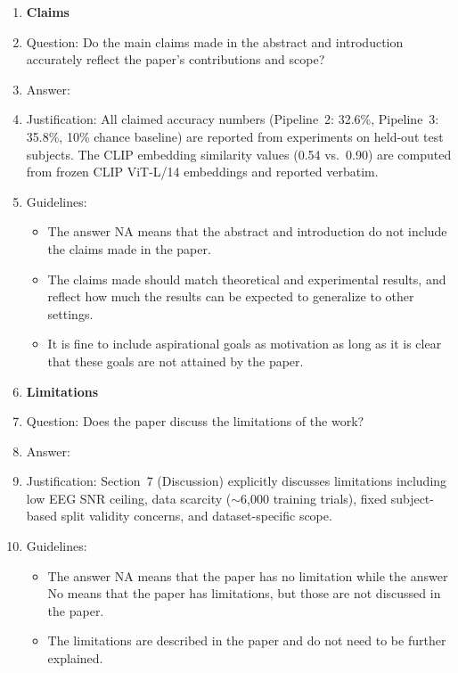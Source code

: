 \documentclass{article}
\begin{document}
\begin{enumerate}

\item {\bf Claims}
    \item[] Question: Do the main claims made in the abstract and introduction accurately reflect the paper's contributions and scope?
    \item[] Answer: \answerYes{}
    \item[] Justification: All claimed accuracy numbers (Pipeline~2: 32.6\%, Pipeline~3: 35.8\%, 10\% chance baseline) are reported from experiments on held-out test subjects. The CLIP embedding similarity values (0.54 vs.\ 0.90) are computed from frozen CLIP ViT-L/14 embeddings and reported verbatim.
    \item[] Guidelines:
    \begin{itemize}
        \item The answer NA means that the abstract and introduction do not include the claims made in the paper.
        \item The claims made should match theoretical and experimental results, and reflect how much the results can be expected to generalize to other settings.
        \item It is fine to include aspirational goals as motivation as long as it is clear that these goals are not attained by the paper.
    \end{itemize}

\item {\bf Limitations}
    \item[] Question: Does the paper discuss the limitations of the work?
    \item[] Answer: \answerYes{}
    \item[] Justification: Section~7 (Discussion) explicitly discusses limitations including low EEG SNR ceiling, data scarcity ($\sim$6,000 training trials), fixed subject-based split validity concerns, and dataset-specific scope.
    \item[] Guidelines:
    \begin{itemize}
        \item The answer NA means that the paper has no limitation while the answer No means that the paper has limitations, but those are not discussed in the paper.
        \item The limitations are described in the paper and do not need to be further explained.
    \end{itemize}


\end{enumerate}
\end{document}
